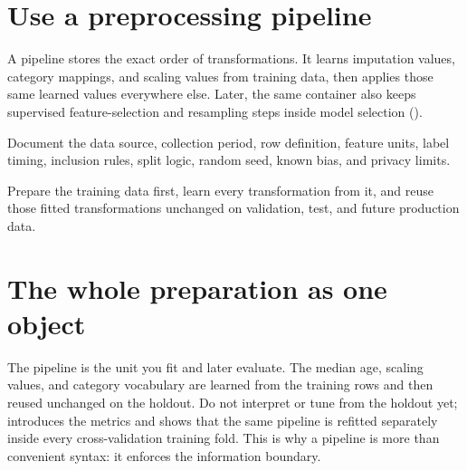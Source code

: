 \section{Use a preprocessing pipeline}
\label{sec:preprocessing-pipeline}

A pipeline stores the exact order of transformations. It learns imputation values, category mappings, and scaling values from training data, then applies those same learned values everywhere else. Later, the same container also keeps supervised feature-selection and resampling steps inside model selection ().

\begin{mlfigure}
\end{mlfigure}

Document the data source, collection period, row definition, feature units, label timing, inclusion rules, split logic, random seed, known bias, and privacy limits.

\begin{keyidea}
Prepare the training data first, learn every transformation from it, and reuse those fitted transformations unchanged on validation, test, and future production data.
\end{keyidea}

\section{The whole preparation as one object}

\begin{keyidea}
The pipeline is the unit you fit and later evaluate. The median age, scaling values, and category vocabulary are learned from the training rows and then reused unchanged on the holdout. Do not interpret or tune from the holdout yet;  introduces the metrics and shows that the same pipeline is refitted separately inside every cross-validation training fold. This is why a pipeline is more than convenient syntax: it enforces the information boundary.
\end{keyidea}

